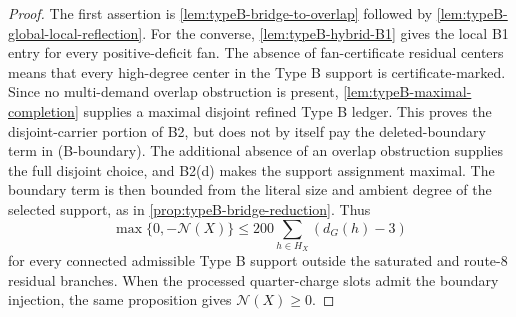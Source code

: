 \documentclass[11pt]{article}
\newcommand{\No}{\mathcal N}
\begin{document}
\begin{proof}
The first assertion is \cref{lem:typeB-bridge-to-overlap} followed by
\cref{lem:typeB-global-local-reflection}.  For the converse,
\cref{lem:typeB-hybrid-B1} gives the local B1 entry for every positive-deficit
fan.  The absence of fan-certificate residual centers means that every
high-degree center in the Type B support is certificate-marked.  Since no
multi-demand overlap obstruction is present,
\cref{lem:typeB-maximal-completion} supplies a maximal disjoint refined Type B
ledger.  This proves the disjoint-carrier portion of B2, but does not by itself
pay the deleted-boundary term in \textup{(B-boundary)}.  The additional absence
of an overlap obstruction supplies the full disjoint choice, and B2(d) makes
the support assignment maximal.  The boundary term is then bounded from the
literal size and ambient degree of the selected support, as in
\cref{prop:typeB-bridge-reduction}.  Thus
\[
\max\{0,-\No(X)\}\le
200\sum_{h\in H_X}(d_G(h)-3)
\]
for every connected admissible Type B support outside the saturated and
route-8 residual branches.  When the processed quarter-charge slots admit the
boundary injection, the same proposition gives \(\No(X)\ge0\).
\end{proof}
\end{document}
